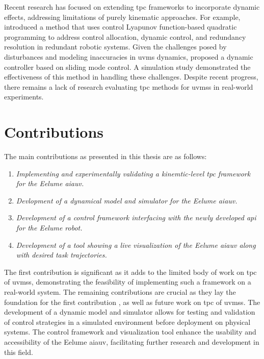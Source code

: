 Recent research has focused on extending \gls{tpc} frameworks to incorporate
dynamic effects, addressing limitations of purely kinematic approaches.
For example, \cite{basso2020} introduced a method that uses control 
Lyapunov function-based quadratic programming to address control allocation, 
dynamic control, and redundancy resolution in redundant robotic systems. Given 
the challenges posed by disturbances and modeling inaccuracies in \gls{uvms} 
dynamics, \cite{iversflaten2022} proposed a dynamic controller based on sliding 
mode control. A simulation study demonstrated the effectiveness of this method 
in handling these challenges.
Despite recent progress, there remains a lack of research evaluating \gls{tpc}
methods for \gls{uvms}s in real-world experiments.

\section{Contributions}

The main contributions as presented in this thesis are as follows:
\begin{enumerate}
    \item \emph{Implementing and experimentally validating a kinemtic-level \gls{tpc} framework for the Eelume \gls{aiauv}.}
    \item \emph{Devlopment of a dynamical model and simulator for the Eelume \gls{aiauv}.}
    \item \emph{Development of a control framework interfacing with the newly developed \gls{api} for the Eelume robot.}
    \item \emph{Development of a tool showing a live visualization of the Eelume \gls{aiauv} along with desired task trajectories.}
\end{enumerate}

The first contribution is significant as it adds to the limited body of work 
on \gls{tpc} of \glspl{uvms}, demonstrating the feasibility of 
implementing such a framework on a real-world system. The remaining 
contributions are crucial as they lay the foundation for the first contribution
, as well as future work on \gls{tpc} of \glspl{uvms}. The 
development of a dynamic model and simulator allows for testing and validation 
of control strategies in a simulated environment before deployment on physical 
systems. The control framework and visualization tool enhance the usability 
and accessibility of the Eelume \gls{aiauv}, facilitating further research and 
development in this field.


